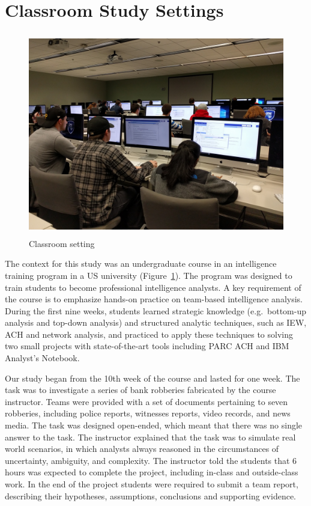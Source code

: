 \section{Classroom Study Settings}\label{classroom-study-settings}

\begin{figure}
\centering
\includegraphics[height=3.5in]{./img/classroom_setting.jpg}
\caption{Classroom setting}\label{fig:classroom}
\end{figure}

The context for this study was an undergraduate course in an
intelligence training program in a US university (Figure~\ref{fig:classroom}). The program was
designed to train students to become professional intelligence analysts.
A key requirement of the course is to emphasize hands-on practice on
team-based intelligence analysis. During the first nine weeks, students
learned strategic knowledge (e.g.~bottom-up analysis and top-down
analysis) and structured analytic techniques, such as IEW, ACH and
network analysis, and practiced to apply these techniques to solving two
small projects with state-of-the-art tools including PARC ACH and IBM
Analyst's Notebook.

Our study began from the 10th week of the course and lasted for one
week. The task was to investigate a series of bank robberies fabricated
by the course instructor. Teams were provided with a set of documents
pertaining to seven robberies, including police reports, witnesses
reports, video records, and news media. The task was designed
open-ended, which meant that there was no single answer to the task. The
instructor explained that the task was to simulate real world scenarios,
in which analysts always reasoned in the circumstances of uncertainty,
ambiguity, and complexity. The instructor told the students that 6 hours
was expected to complete the project, including in-class and
outside-class work. In the end of the project students were required to
submit a team report, describing their hypotheses, assumptions,
conclusions and supporting evidence.

